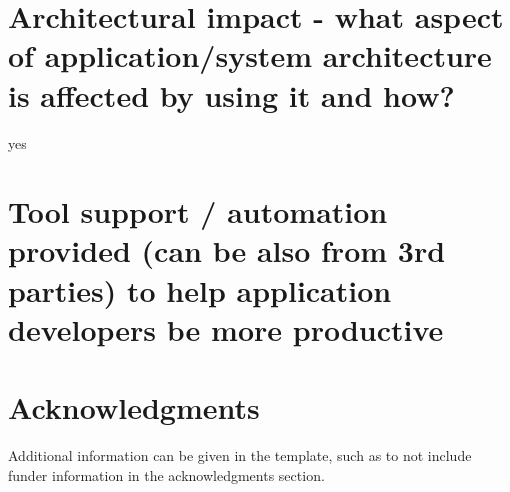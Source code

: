 \documentclass[fleqn,12pt]{olplainarticle}
\begin{document}
\section*{Architectural impact - what aspect of application/system architecture is affected by using it and how?}
yes
\section*{Tool support / automation provided (can be also from 3rd parties) to help application developers be more productive}

\section*{Acknowledgments}

Additional information can be given in the template, such as to not include funder information in the acknowledgments section.


\end{document}
